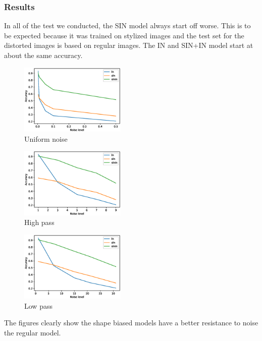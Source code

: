 \documentclass{article}
\begin{document}
\subsubsection{Results}

In all of the test we conducted, the SIN model always start off worse. This is to be expected because it was trained on stylized images 
and the test set for the distorted images is based on regular images. The IN and SIN+IN model start at about the same accuracy.

\begin{figure}[h!]
\centering
\includegraphics[width = 0.45\textwidth]{imgs/uniform}
\caption{Uniform noise}
\label{uniform_noise}
\end{figure}

\begin{figure}[h!]
\centering
\includegraphics[width = 0.45\textwidth]{imgs/high_pass}
\caption{High pass}
\label{high_pass}
\end{figure}

\begin{figure}[h!]
\centering
\includegraphics[width = 0.45\textwidth]{imgs/low_pass}
\caption{Low pass}
\label{low_pass}
\end{figure}

The figures clearly show the shape biased models have a better resistance to noise the regular model.
\end{document}
